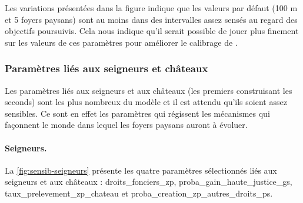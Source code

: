 Les variations présentées dans la figure indique que les valeurs par défaut (100 m et 5 foyers paysans) sont au moins dans des intervalles assez sensés au regard des objectifs poursuivis.
Cela nous indique qu'il serait possible de jouer plus finement sur les valeurs de ces paramètres pour améliorer le calibrage de \simfeodal{}.

\subsubsection{Paramètres liés aux seigneurs et châteaux \label{sssec:sensib-params-seigneurs}}

Les paramètres liés aux seigneurs et aux châteaux (les premiers construisant les seconds) sont les plus nombreux du modèle et il est attendu qu'ils soient assez sensibles.
Ce sont en effet les paramètres qui régissent les mécanismes qui façonnent le monde dans lequel les foyers paysans auront à évoluer.

\paragraph{Seigneurs.}

La \cref{fig:sensib-seigneurs} présente les quatre paramètres sélectionnés liés aux seigneurs et aux châteaux :
\textsf{droits\_fonciers\_zp}, \textsf{proba\_gain\_haute\_justice\_gs}, \textsf{taux\_prelevement\_zp\_chateau} et \textsf{proba\_creation\_zp\_autres\_droits\_ps}.

